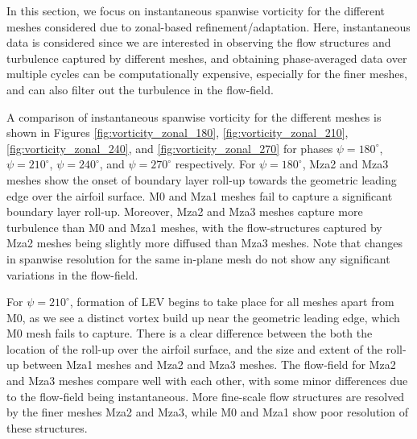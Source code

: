 


In this section, we focus on instantaneous spanwise vorticity for the different meshes considered due to zonal-based refinement/adaptation. Here, instantaneous data is considered since we are interested in observing the flow structures and turbulence captured by different meshes, and obtaining phase-averaged data over multiple cycles can be computationally expensive, especially for the finer meshes, and can also filter out the turbulence in the flow-field.

A comparison of instantaneous spanwise vorticity for the different meshes is shown in Figures \ref{fig:vorticity_zonal_180}, \ref{fig:vorticity_zonal_210}, \ref{fig:vorticity_zonal_240}, and \ref{fig:vorticity_zonal_270} for phases $\psi=180^\circ$, $\psi=210^\circ$, $\psi=240^\circ$, and $\psi=270^\circ$ respectively. For $\psi=180^\circ$, Mza2 and Mza3 meshes show the onset of boundary layer roll-up towards the geometric leading edge over the airfoil surface. M0 and Mza1 meshes fail to capture a significant boundary layer roll-up. Moreover, Mza2 and Mza3 meshes capture more turbulence than M0 and Mza1 meshes, with the flow-structures captured by Mza2 meshes being slightly more diffused than Mza3 meshes. Note that changes in spanwise resolution for the same in-plane mesh do not show any significant variations in the flow-field.

For $\psi=210^\circ$, formation of LEV begins to take place for all meshes apart from M0, as we see a distinct vortex build up near the geometric leading edge, which M0 mesh fails to capture. There is a clear difference between the both the location of the roll-up over the airfoil surface, and the size and extent of the roll-up between Mza1 meshes and Mza2 and Mza3 meshes. The flow-field for Mza2 and Mza3 meshes compare well with each other, with some minor differences due to the flow-field being instantaneous. More fine-scale flow structures are resolved by the finer meshes Mza2 and Mza3, while M0 and Mza1 show poor resolution of these structures.





